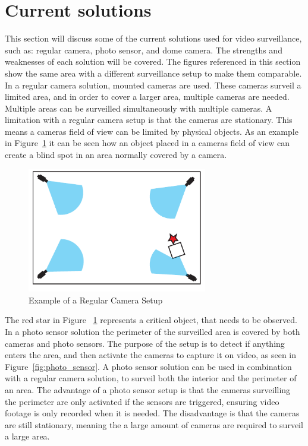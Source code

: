 \section{Current solutions}
This section will discuss some of the current solutions used for video surveillance, such as: regular camera, photo sensor, and dome camera.
The strengths and weaknesses of each solution will be covered.
The figures referenced in this section show the same area with a different surveillance setup to make them comparable. \\

In a regular camera solution, mounted cameras are used.
These cameras surveil a limited area, and in order to cover a larger area, multiple cameras are needed.
Multiple areas can be surveilled simultaneously with multiple cameras.
A limitation with a regular camera setup is that the cameras are stationary.
This means a cameras field of view can be limited by physical objects.
As an example in Figure~\ref{fig:refular_camera_setup} it can be seen how an object placed in a cameras field of view can create a blind spot in an area normally covered by a camera. \\

\begin{figure}[htb]
    \centering
    \includegraphics[width=0.7\textwidth]{gfx/regular_camera_setup.pdf}
    \caption{Example of a Regular Camera Setup}
    \label{fig:refular_camera_setup}
\end{figure}

The red star in Figure ~\ref{fig:refular_camera_setup} represents a critical object, that needs to be observed. \\

In a photo sensor solution the perimeter of the surveilled area is covered by both cameras and photo sensors.
The purpose of the setup is to detect if anything enters the area, and then activate the cameras to capture it on video, as seen in Figure~\ref{fig:photo_sensor}.
A photo sensor solution can be used in combination with a regular camera solution, to surveil both the interior and the perimeter of an area.
The advantage of a photo sensor setup is that the cameras surveilling the perimeter are only activated if the sensors are triggered, ensuring video footage is only recorded when it is needed.
The disadvantage is that the cameras are still stationary, meaning the a large amount of cameras are required to surveil a large area. \\

